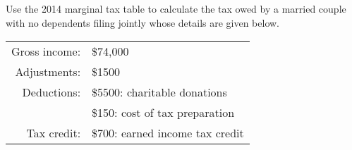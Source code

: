 \begin{try}
Use the 2014 marginal tax table to calculate the tax owed by a married couple with no dependents filing jointly whose details are given below.
\begin{center}
\begin{tabular}{r l}
Gross income: & \$74,000\\
Adjustments: & \$1500\\
Deductions: & \$5500: charitable donations\\
& \$150: cost of tax preparation\\
Tax credit: & \$700: earned income tax credit
\end{tabular}
\end{center}
\end{try}
\vfill
\pagebreak

